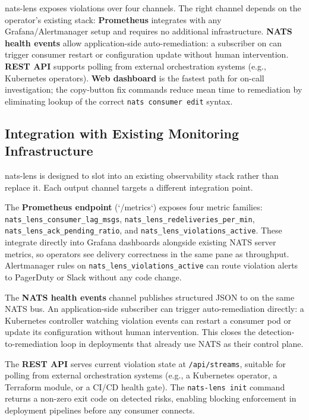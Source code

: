 \documentclass[journal]{IEEEtran}
\begin{document}
nats-lens exposes violations over four channels. The right channel
depends on the operator's existing stack:
\textbf{Prometheus} integrates with any Grafana/Alertmanager setup and
requires no additional infrastructure.
\textbf{NATS health events} allow application-side auto-remediation:
a subscriber on  can trigger
consumer restart or configuration update without human intervention.
\textbf{REST API} supports polling from external orchestration systems
(e.g., Kubernetes operators).
\textbf{Web dashboard} is the fastest path for on-call investigation;
the copy-button fix commands reduce mean time to remediation by
eliminating lookup of the correct \texttt{nats consumer edit} syntax.

\subsection{Integration with Existing Monitoring Infrastructure}

nats-lens is designed to slot into an existing observability stack rather
than replace it. Each output channel targets a different integration point.

The \textbf{Prometheus endpoint} (`/metrics`) exposes four metric families:
\texttt{nats\_lens\_consumer\_lag\_msgs}, \texttt{nats\_lens\_redeliveries\_per\_min},
\texttt{nats\_lens\_ack\_pending\_ratio}, and \texttt{nats\_lens\_violations\_active}.
These integrate directly into Grafana dashboards alongside existing NATS
server metrics, so operators see delivery correctness in the same pane as
throughput. Alertmanager rules on \texttt{nats\_lens\_violations\_active}
can route violation alerts to PagerDuty or Slack without any code change.

The \textbf{NATS health events} channel publishes structured JSON to
 on the same
NATS bus. An application-side subscriber can trigger auto-remediation
directly: a Kubernetes controller watching violation events can restart
a consumer pod or update its configuration without human intervention.
This closes the detection-to-remediation loop in deployments that already
use NATS as their control plane.

The \textbf{REST API} serves current violation state at
\texttt{/api/streams}, suitable for polling from external orchestration
systems (e.g., a Kubernetes operator, a Terraform module, or a CI/CD
health gate). The \texttt{nats-lens init} command returns a non-zero exit
code on detected risks, enabling blocking enforcement in deployment
pipelines before any consumer connects.
\end{document}
